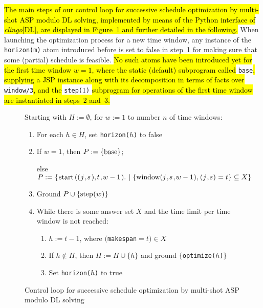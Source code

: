 \documentclass{tlp} %
\newcommand{\clingodl}{\emph{clingo}[DL]\xspace}
\begin{document}
\hl{The main steps of our control loop for successive schedule optimization
by multi-shot ASP modulo DL solving, implemented by means of the Python interface of \clingodl,
are displayed in Figure~{\ref{fig:enum}} and further detailed in the following.}
When launching the optimization process for a new time window, any instance of the
\lstinline{horizon(m)} atom introduced before is set to false in step~1 for making sure that
some (partial) schedule is feasible.
\hl{No such atoms have been introduced yet for the first time window $w=1$,
where the static (default) subprogram called} \lstinline{base}\hl{,
supplying a JSP instance along with its decomposition in terms of facts over} \lstinline{window/3}\hl{,
and the} \lstinline{step(}$1$\lstinline{)} \hl{subprogram for operations of the first time window
are instantiated in steps~2 and~3.}
%
\begin{figure}[tb]
  \begin{tcolorbox}[breakable,arc=0mm,outer arc=0mm,colbacktitle=lightgray!50!white,coltitle=black,colframe=gray,fonttitle=\bfseries,colback=white,subtitle style={colback=white}]
  Starting with $H:=\emptyset$, for $w:= 1$ to number $n$ of time windows:
  \begin{enumerate}[label=\textbf{\arabic*.}]
    \item For each $h\in H$, set \lstinline{horizon(}$h$\lstinline{)} to false
    \item %
          If $w= 1$, %
          then $P:=\{\text{\lstinline{base}}\}$;
  
          else $P := \{\text{\lstinline{start((}$j$\lstinline{,}$s$\lstinline{),}$t$\lstinline{,}$w-1$\lstinline{).}}
                      \mid
                      \{\text{\lstinline{window(}$j$\lstinline{,}$s$\lstinline{,}$w-1$\lstinline{)}},
                      \text{\lstinline{(}$j$\lstinline{,}$s$\lstinline{)}}=t\}\subseteq X\}$
    \item Ground $P\cup\{\text{\lstinline{step(}$w$\lstinline{)}}\}$
    \item While there is some answer set $X$ and the time limit per time window is not reached:
      \begin{enumerate}[label=\textbf{\alph*.}]
      \item $h:=t-1$, where $($\lstinline{makespan}${}=t)\in X$
      \item If $h\notin H$, then $H := H\cup\{h\}$ and ground $\{$\lstinline{optimize(}$h$\lstinline{)}$\}$
      \item Set \lstinline{horizon(}$h$\lstinline{)} to true
      \end{enumerate}
    \end{enumerate}
  \end{tcolorbox}
  \caption{Control loop for successive schedule optimization by multi-shot ASP modulo DL solving\label{fig:enum}}
  \end{figure}%
\end{document}
